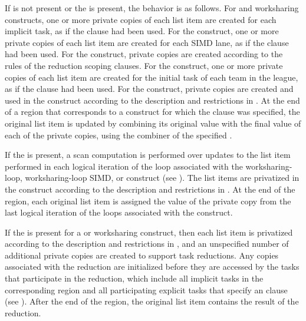 If  is not present or the 
 is present, the behavior is
as follows. For  and worksharing constructs, one or more
private copies of each list item are created for each implicit task, as if the
 clause had been used. For the  construct, one or
more private copies of each list item are created for each SIMD lane, as if the
 clause had been used.  For the  construct,
private copies are created according to the rules of the reduction scoping
clauses.  For the  construct, one or more private copies of each
list item are created for the initial task of each team in the league, as if
the  clause had been used. For the  construct,
private copies are created and used in the construct according to the 
description and restrictions in . At 
the end of a region that corresponds to a construct for which the  
clause was specified, the original list item is updated by combining its original 
value with the final value of each of the private copies, using the combiner of the
specified . 

If the   is present, a scan computation is
performed over updates to the list item performed in each logical iteration of
the loop associated with the worksharing-loop, worksharing-loop SIMD, or
 construct (see ). The list
items are privatized in the construct according to the description and 
restrictions in . At the end of the region, 
each original list item is assigned the value of the private copy from the last 
logical iteration of the loops associated with the construct.

If the   is present for a 
or worksharing construct, then each list item is privatized according to the
description and restrictions in , and 
an unspecified number of additional private copies are created to support task 
reductions.  Any copies associated with the reduction are initialized before they 
are accessed by the tasks that participate in the reduction, which include all 
implicit tasks in the corresponding region and all participating explicit tasks 
that specify an  clause (see 
). After the end of the region, the original 
list item contains the result of the reduction.

